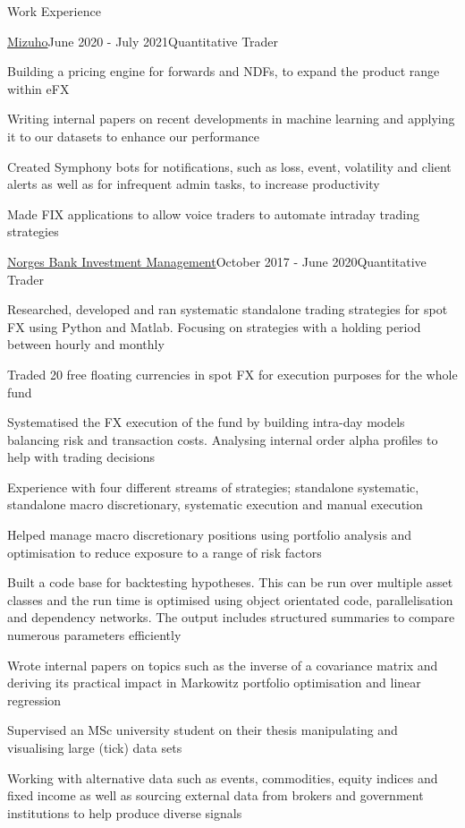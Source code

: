 \documentclass{resume} %
\begin{document}
\begin{rSection}{Work Experience}
\begin{rSubsection}{\href{https://www.mizuhogroup.com/bank/}{Mizuho}}{June 2020 - July 2021}{Quantitative Trader}{}
	\item Building a pricing engine for forwards and NDFs, to expand the product range within eFX
	\item Writing internal papers on recent developments in machine learning and applying it to our datasets to enhance our performance
	\item Created Symphony bots for notifications, such as loss, event, volatility and client alerts as well as for infrequent admin tasks, to increase productivity
	\item Made FIX applications to allow voice traders to automate intraday trading strategies
\end{rSubsection}
\begin{rSubsection}{\href{https://www.nbim.no/}{Norges Bank Investment Management}}{October 2017 - June 2020}{Quantitative Trader}{}
	\item Researched, developed and ran systematic standalone trading strategies for spot FX using Python and Matlab. Focusing on strategies with a holding period between hourly and monthly
	\item Traded 20 free floating currencies in spot FX for execution purposes for the whole fund
	\item Systematised the FX execution of the fund by building intra-day models balancing risk and transaction costs. Analysing internal order alpha profiles to help with trading decisions
	\item Experience with four different streams of strategies; standalone systematic, standalone macro discretionary, systematic execution and manual execution
	\item Helped manage macro discretionary positions using portfolio analysis and optimisation to reduce exposure to a range of risk factors
	\item Built a code base for backtesting hypotheses. This can be run over multiple asset classes and the run time is optimised using object orientated code, parallelisation and dependency networks. The output includes structured summaries to compare numerous parameters efficiently
	\item Wrote internal papers on topics such as the inverse of a covariance matrix and deriving its practical impact in Markowitz portfolio optimisation and linear regression
	\item Supervised an MSc university student on their thesis manipulating and visualising large (tick) data sets
	\item Working with alternative data such as events, commodities, equity indices and fixed income as well as sourcing external data from brokers and government institutions to help produce diverse signals

\end{rSubsection}
\end{rSection}
\end{document}
